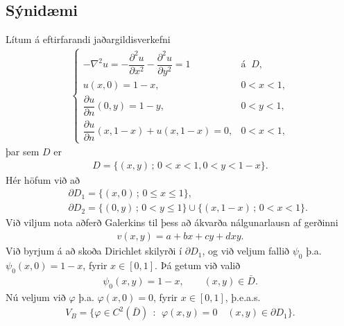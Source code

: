 \documentclass[a4paper,10pt,icelandic]{sphinxmanual}
\begin{document}
\subsection{Sýnidæmi}
\label{\detokenize{Kafli06:synidaemi}}
Lítum á eftirfarandi jaðargildisverkefni
\begin{equation}\label{equation:Kafli06:eq.example2d}
\begin{split}\begin{cases}
-\nabla^2 u= -\dfrac{\partial^2 u}{\partial x^2 }-\dfrac{\partial^2 u}{\partial y^2 }=1 &\text{á } \ D,\\
u(x,0)=1-x, &0<x<1,\\
\dfrac{\partial u}{\partial n}(0,y)=1-y, &0<y<1,\\
\dfrac{\partial u}{\partial n}(x,1-x)+u(x,1-x)=0, &0<x<1,
\end{cases}\end{split}
\end{equation}
þar sem \(D\) er
\begin{equation*}
\begin{split}D=\{(x,y)\, ;\, 0<x<1, 0<y<1-x\}.\end{split}
\end{equation*}
Hér höfum við að
\begin{equation*}
\begin{split}&&\partial D_1 =\{(x,0)\, ;\, 0\leq x\leq 1\},\\
&&\partial D_2 =\{(0,y)\, ;\, 0<y\leq 1\}\cup \{(x,1-x)\, ;\, 0< x<1\}.\end{split}
\end{equation*}
Við viljum nota aðferð Galerkins til þess að ákvarða nálgunarlausn af gerðinni
\begin{equation*}
\begin{split}v(x,y)=a+bx+cy+dxy.\end{split}
\end{equation*}
Við byrjum á að skoða Dirichlet skilyrði í \(\partial D_1\), og við veljum fallið \(\psi_0\) þ.a. \(\psi_0(x,0)=1-x\), fyrir \(x\in [0,1]\).
Þá getum við valið
\begin{equation*}
\begin{split}\psi_0(x,y)=1-x, \qquad (x,y)\in \bar D.\end{split}
\end{equation*}
Nú veljum við \(\varphi\) þ.a. \(\varphi(x,0)=0\), fyrir \(x\in [0,1]\), þ.e.a.s.
\begin{equation*}
\begin{split}V_B=\{ \varphi\in C^2(\bar D)~~: ~~\varphi(x,y)=0 \quad (x,y)\in \partial D_1 \}.\end{split}
\end{equation*}
\end{document}
